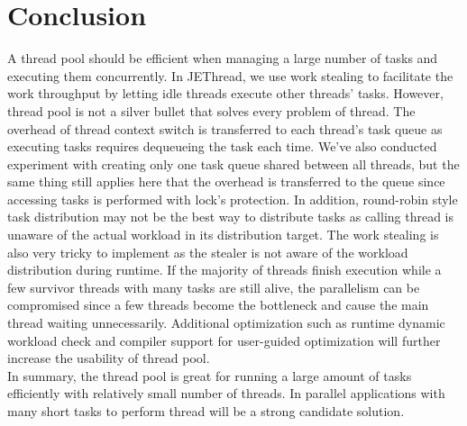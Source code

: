 \documentclass[journal, a4paper]{IEEEtran}
\begin{document}
\FloatBarrier

\section{Conclusion}
	A thread pool should be efficient when managing a large number of tasks and executing them concurrently. In JEThread, we use work stealing to facilitate the work throughput by letting idle threads execute other threads' tasks. However, thread pool is not a silver bullet that solves every problem of thread. The overhead of thread context switch is transferred to each thread's task queue as executing tasks requires dequeueing the task each time. We've also conducted experiment with creating only one task queue shared between all threads, but the same thing still applies here that the overhead is transferred to the queue since accessing tasks is performed with lock's protection. In addition, round-robin style task distribution may not be the best way to distribute tasks as calling thread is unaware of the actual workload in its distribution target. The work stealing is also very tricky to implement as the stealer is not aware of the workload distribution during runtime. If the majority of threads finish execution while a few survivor threads with many tasks are still alive, the parallelism can be compromised since a few threads become the bottleneck and cause the main thread waiting unnecessarily. Additional optimization such as runtime dynamic workload check and compiler support for user-guided optimization will further increase the usability of thread pool.\\
	
	In summary, the thread pool is great for running a large amount of tasks efficiently with relatively small number of threads. In parallel applications with many short tasks to perform thread will be a strong candidate solution.

\end{document}
